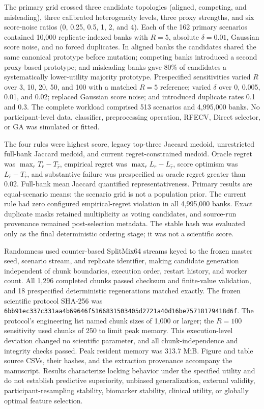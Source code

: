 The primary grid crossed three candidate topologies (aligned, competing, and misleading), three calibrated heterogeneity levels, three proxy strengths, and six score-noise ratios (0, 0.25, 0.5, 1, 2, and 4). Each of the 162 primary scenarios contained 10,000 replicate-indexed banks with $R=5$, absolute $\delta=0.01$, Gaussian score noise, and no forced duplicates. In aligned banks the candidates shared the same canonical prototype before mutation; competing banks introduced a second proxy-based prototype; and misleading banks gave 80\% of candidates a systematically lower-utility majority prototype. Prespecified sensitivities varied $R$ over 3, 10, 20, 50, and 100 with a matched $R=5$ reference; varied $\delta$ over 0, 0.005, 0.01, and 0.02; replaced Gaussian score noise; and introduced duplicate rates 0.1 and 0.3. The complete workload comprised 513 scenarios and 4,995,000 banks. No participant-level data, classifier, preprocessing operation, RFECV, Direct selector, or GA was simulated or fitted.

The four rules were highest score, legacy top-three Jaccard medoid, unrestricted full-bank Jaccard medoid, and current regret-constrained medoid. Oracle regret was $\max_rT_r-T_{\widehat r}$, empirical regret was $\max_rL_r-L_{\widehat r}$, score optimism was $L_{\widehat r}-T_{\widehat r}$, and substantive failure was prespecified as oracle regret greater than 0.02. Full-bank mean Jaccard quantified representativeness. Primary results are equal-scenario means: the scenario grid is not a population prior. The current rule had zero configured empirical-regret violation in all 4,995,000 banks. Exact duplicate masks retained multiplicity as voting candidates, and source-run provenance remained post-selection metadata. The stable hash was evaluated only as the final deterministic ordering stage; it was not a scientific score.

Randomness used counter-based SplitMix64 streams keyed to the frozen master seed, scenario stream, and replicate identifier, making candidate generation independent of chunk boundaries, execution order, restart history, and worker count. All 1,296 completed chunks passed checksum and finite-value validation, and 18 prespecified deterministic regenerations matched exactly. The frozen scientific protocol SHA-256 was \texttt{6bb91ec337c331aa4b69646f5166831503405d2721a40d16be75718179418d6f}. The protocol's engineering list named chunk sizes of 1,000 or larger; the $R=100$ sensitivity used chunks of 250 to limit peak memory. This execution-level deviation changed no scientific parameter, and all chunk-independence and integrity checks passed. Peak resident memory was 313.7 MiB. Figure and table source CSVs, their hashes, and the extraction provenance accompany the manuscript. Results characterize locking behavior under the specified utility and do not establish predictive superiority, unbiased generalization, external validity, participant-resampling stability, biomarker stability, clinical utility, or globally optimal feature selection.

